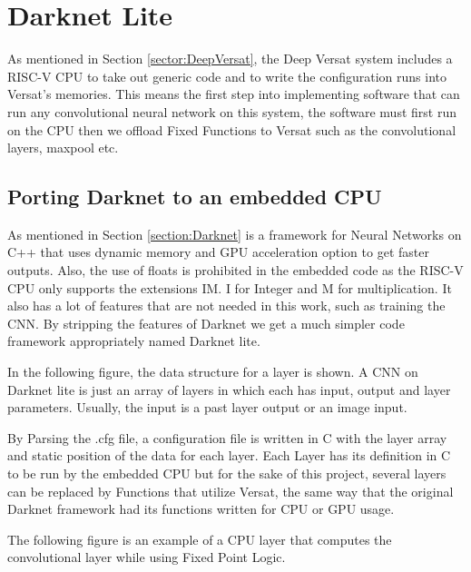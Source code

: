 \chapter{Darknet Lite}
\label{chapter:Darknet}

As mentioned in Section \ref{sector:DeepVersat}, the Deep Versat system includes a RISC-V CPU to take out generic
code and to write the configuration runs into Versat's memories. This means the first step into implementing software
that can run any convolutional neural network on this system, the software must first run on the CPU then we offload Fixed Functions 
to Versat such as the convolutional layers, maxpool etc.

\section{Porting Darknet to an embedded CPU}

As mentioned in Section \ref{section:Darknet} is a framework for Neural Networks on C++ that uses dynamic memory 
and GPU acceleration option to get faster outputs.
Also, the use of floats is prohibited in the embedded code
as the RISC-V CPU only supports the extensions IM. I for Integer and M for multiplication.
It also has a lot of features that are not needed in this work, such as training the CNN.
By stripping the features of Darknet we get a much simpler
code framework appropriately named Darknet lite.

In the following figure, 
the data structure for a layer is shown. A CNN on Darknet lite is just an array of layers in which each has input, 
output and layer parameters. 
Usually, the input is a past layer output or an image input.



By Parsing the .cfg file, a configuration file is written in C with the layer array and static position of the data for each layer. 
Each Layer has its definition in C to be run by the embedded CPU but for the sake of this project, several layers can be
replaced by Functions that utilize Versat, the same way that the original Darknet framework had its functions written for CPU or GPU usage.

The following figure is an example of a CPU layer that computes the convolutional layer while using Fixed Point Logic.

